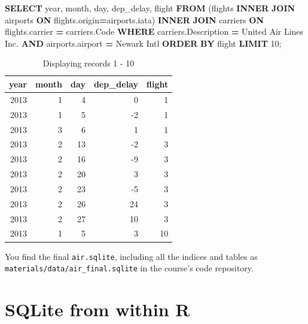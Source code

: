 \documentclass[
  12pt,
]{style/krantz}
\newenvironment{Shaded}{\begin{snugshade}}{\end{snugshade}}
\newcommand{\DataTypeTok}[1]{\textcolor[rgb]{0.13,0.29,0.53}{#1}}
\newcommand{\DecValTok}[1]{\textcolor[rgb]{0.00,0.00,0.81}{#1}}
\newcommand{\KeywordTok}[1]{\textcolor[rgb]{0.13,0.29,0.53}{\textbf{#1}}}
\newcommand{\NormalTok}[1]{#1}
\newcommand{\OperatorTok}[1]{\textcolor[rgb]{0.81,0.36,0.00}{\textbf{#1}}}
\newcommand{\StringTok}[1]{\textcolor[rgb]{0.31,0.60,0.02}{#1}}
\begin{document}
\begin{Shaded}
\begin{Highlighting}[]
\KeywordTok{SELECT} 
\DataTypeTok{year}\NormalTok{,}
\DataTypeTok{month}\NormalTok{, }
\DataTypeTok{day}\NormalTok{,}
\NormalTok{dep\_delay,}
\NormalTok{flight}
\KeywordTok{FROM}\NormalTok{ (flights }\KeywordTok{INNER} \KeywordTok{JOIN}\NormalTok{ airports }\KeywordTok{ON}\NormalTok{ flights.origin}\OperatorTok{=}\NormalTok{airports.iata) }
\KeywordTok{INNER} \KeywordTok{JOIN}\NormalTok{ carriers }\KeywordTok{ON}\NormalTok{ flights.carrier }\OperatorTok{=}\NormalTok{ carriers.Code}
\KeywordTok{WHERE}\NormalTok{ carriers.Description }\OperatorTok{=} \StringTok{\textquotesingle{}United Air Lines Inc.\textquotesingle{}}
\KeywordTok{AND}\NormalTok{ airports.airport }\OperatorTok{=} \StringTok{\textquotesingle{}Newark Intl\textquotesingle{}}
\KeywordTok{ORDER} \KeywordTok{BY}\NormalTok{ flight}
\KeywordTok{LIMIT} \DecValTok{10}\NormalTok{;}
\end{Highlighting}
\end{Shaded}

\begin{table}

\caption{\label{tab:unnamed-chunk-119}Displaying records 1 - 10}
\centering
\begin{tabular}[t]{r|r|r|r|r}
\hline
year & month & day & dep\_delay & flight\\
\hline
2013 & 1 & 4 & 0 & 1\\
\hline
2013 & 1 & 5 & -2 & 1\\
\hline
2013 & 3 & 6 & 1 & 1\\
\hline
2013 & 2 & 13 & -2 & 3\\
\hline
2013 & 2 & 16 & -9 & 3\\
\hline
2013 & 2 & 20 & 3 & 3\\
\hline
2013 & 2 & 23 & -5 & 3\\
\hline
2013 & 2 & 26 & 24 & 3\\
\hline
2013 & 2 & 27 & 10 & 3\\
\hline
2013 & 1 & 5 & 3 & 10\\
\hline
\end{tabular}
\end{table}

You find the final \texttt{air.sqlite}, including all the indices and tables as \texttt{materials/data/air\_final.sqlite} in the course's code repository.

\hypertarget{sqlite-from-within-r}{%
\section{SQLite from within R}\label{sqlite-from-within-r}}
\end{document}
